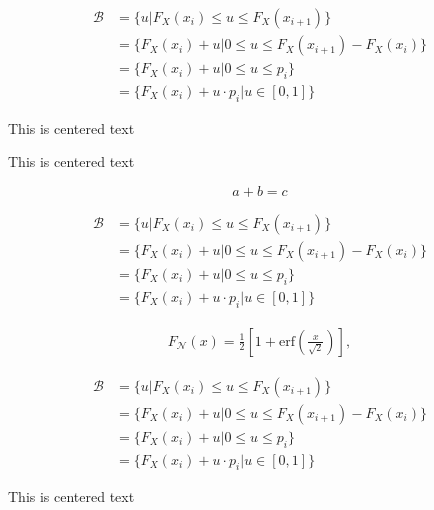 \begin{align*}
    \mathcal{B} &=\{u | F_X(x_i) \leq u \leq F_X(x_{i+1})\} \\
                &= \{F_X(x_i) + u | 0 \leq u \leq F_X(x_{i+1}) - F_X(x_i)\} \\
                &=\{F_X(x_i) + u | 0 \leq u \leq p_i\}\\
                &=  \{F_X(x_i) + u \cdot p_i | u \in [0,1] \}
\end{align*}

\begin{center}
This is centered text
\end{center}


\begin{center}
This is centered text
\end{center}

\[
a + b = c
\]


\begin{align*}
    \mathcal{B} &=\{u | F_X(x_i) \leq u \leq F_X(x_{i+1})\} \\
                &= \{F_X(x_i) + u | 0 \leq u \leq F_X(x_{i+1}) - F_X(x_i)\} \\
                &=\{F_X(x_i) + u | 0 \leq u \leq p_i\}\\
                &=  \{F_X(x_i) + u \cdot p_i | u \in [0,1] \}
\end{align*}


\begin{align*}
    F_{\mathcal{N}}(x)=\frac{1}{2} \left[1 + \text{erf}\left( \frac{x}{\sqrt{2}} \right) \right] ,
\end{align*}

\begin{align*}
    \mathcal{B} &=\{u | F_X(x_i) \leq u \leq F_X(x_{i+1})\} \\
                &= \{F_X(x_i) + u | 0 \leq u \leq F_X(x_{i+1}) - F_X(x_i)\} \\
                &=\{F_X(x_i) + u | 0 \leq u \leq p_i\}\\
                &=  \{F_X(x_i) + u \cdot p_i | u \in [0,1] \}
\end{align*}

\begin{center}
This is centered text
\end{center}

